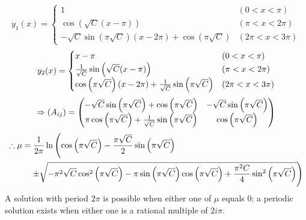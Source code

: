 \[
    y_1(x) = \begin{cases}
        1 & (0 < x < \pi) \\
        \cos\left( \sqrt{C} (x - \pi) \right) & (\pi < x < 2\pi) \\
        -\sqrt{C}\sin\left( \pi\sqrt{C} \right)
        \left( x - 2\pi \right) + \cos \left( \pi \sqrt{C} \right)
        & (2\pi < x < 3\pi)
    \end{cases}
\]
\[
    y_2(x) = \begin{cases}
        x - \pi & (0 < x < \pi) \\
        \frac{1}{\sqrt{C}} \sin\left( \sqrt{C}(x - \pi) \right) & ( \pi < x < 2\pi) \\
        \cos\left( \pi\sqrt{C} \right) (x - 2\pi) + \frac{1}{\sqrt{C}}\sin\left( \pi\sqrt{C} \right)
        & (2\pi < x < 3\pi)
    \end{cases}
\]
\[
    \Rightarrow \left( A_{ij} \right)
    = \begin{pmatrix}
        -\sqrt{C}\sin\left( \pi\sqrt{C} \right) + \cos\left( \pi\sqrt{C} \right)
        & - \sqrt{C} \sin\left( \pi \sqrt{C} \right)\\
        \pi\cos\left(\pi\sqrt{C} \right) + \frac{1}{\sqrt{C}} \sin\left( \pi\sqrt{C} \right)
        & \cos\left(\pi\sqrt{C}\right)
    \end{pmatrix}
\]
\begin{align*}
    \therefore \mu
    &= \frac{1}{2\pi} \ln\left(
        \cos\left( \pi\sqrt{C} \right)
        - \frac{\pi\sqrt{C}}{2} \sin\left( \pi\sqrt{C} \right)
    \right. \\
    &\quad \left.
        \pm \sqrt{
            -\pi^2\sqrt{C} \cos^2\left( \pi\sqrt{C} \right)
            -\pi\sin\left( \pi\sqrt{C} \right) \cos\left( \pi\sqrt{C} \right)
            + \frac{\pi^2C}{4}\sin^2\left( \pi\sqrt{C} \right)
        }
    \right)
\end{align*}
A solution with period $2\pi$ is possible when either one of $\mu$ equals 0;
a periodic solution exists when either one is a rational multiple of $2i\pi$.